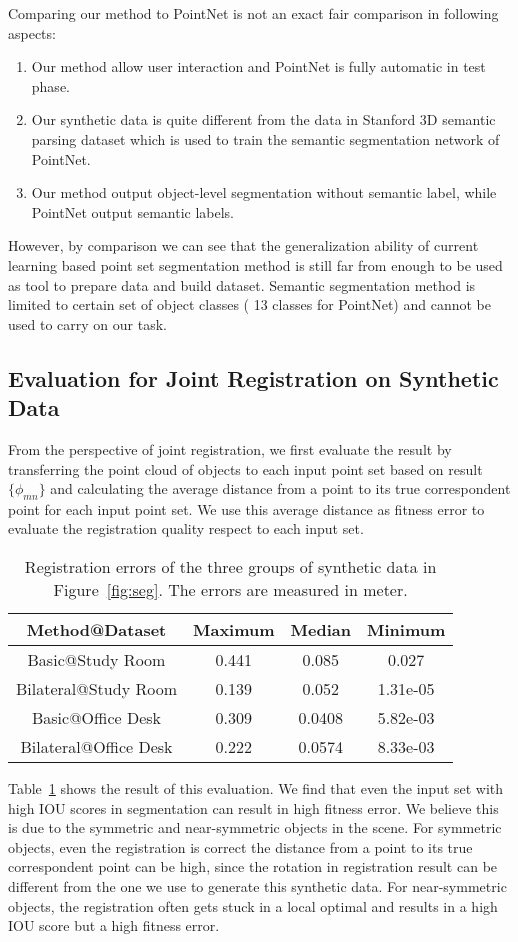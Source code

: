 %
Comparing our method to PointNet is not an exact fair comparison in following aspects:
\begin{enumerate}
\item Our method allow user interaction and PointNet is fully automatic in test phase.
\item Our synthetic data is quite different from the data in Stanford 3D semantic parsing dataset\cite{semsegdataset} which is used to train the semantic segmentation network of PointNet.
\item Our method output object-level segmentation without semantic label, while PointNet output semantic labels.  
\end{enumerate}
However, by comparison we can see that the generalization ability of current learning based point set segmentation method is still far from enough to be used as tool to prepare data and build dataset. Semantic segmentation method is limited to certain set of object classes ( 13 classes for PointNet) and cannot be used to carry on our task. 
\subsection{Evaluation for Joint Registration on Synthetic Data}
From the perspective of joint registration, we first evaluate the result by transferring the point cloud of objects to each input point set based on result $\{\phi_{mn}\}$ and calculating the average distance from a point to its true correspondent point for each input point set.
We use this average distance as fitness error to evaluate the registration quality respect to each input set.

\begin{table}
	\centering
	\caption{Registration errors of the three groups of synthetic data in Figure~\ref{fig:seg}. The errors are measured in meter.}
	\begin{tabular}{c | c c c}
		Method@Dataset&Maximum&Median&Minimum\\
		\hline 
		Basic@Study Room&0.441&0.085&0.027\\
		Bilateral@Study Room&0.139&0.052&1.31e-05\\
	    Basic@Office Desk&0.309&0.0408&5.82e-03\\
		Bilateral@Office Desk&0.222&0.0574&8.33e-03\\
	\end{tabular}
	\label{tab:regerror}
\end{table}

Table~\ref{tab:regerror} shows the result of this evaluation.
%
We find that even the input set with high IOU scores in segmentation can result in high fitness error. We believe this is due to the symmetric and near-symmetric objects in the scene. For symmetric objects, even the registration is correct the distance from a point to its true correspondent point can be high, since the rotation in registration result can be different from the one we use to generate this synthetic data. For near-symmetric objects, the registration often gets stuck in a local optimal and results in a high IOU score but a high fitness error.

